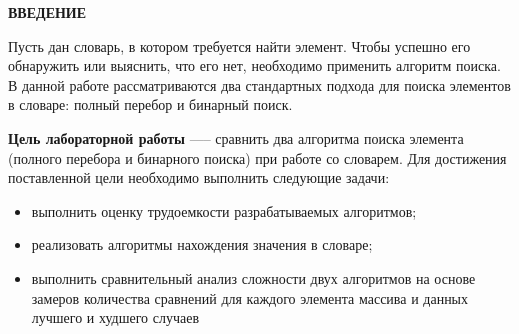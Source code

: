 \begin{center}
    \textbf{ВВЕДЕНИЕ}
\end{center}

Пусть дан словарь, в котором требуется найти элемент. Чтобы успешно его обнаружить или выяснить, что его нет, необходимо применить алгоритм поиска. В данной работе рассматриваются два стандартных подхода для поиска элементов в словаре: полный перебор и бинарный поиск.

\textbf{Цель лабораторной работы} —-- сравнить два алгоритма поиска элемента (полного перебора и бинарного поиска) при работе со словарем. Для достижения поставленной цели необходимо выполнить следующие задачи:

\begin{itemize}
    \item выполнить оценку трудоемкости разрабатываемых алгоритмов;
    \item реализовать алгоритмы нахождения значения в словаре;
    \item выполнить сравнительный анализ сложности двух алгоритмов на основе замеров количества сравнений для каждого элемента массива и данных лучшего и худшего случаев
\end{itemize}